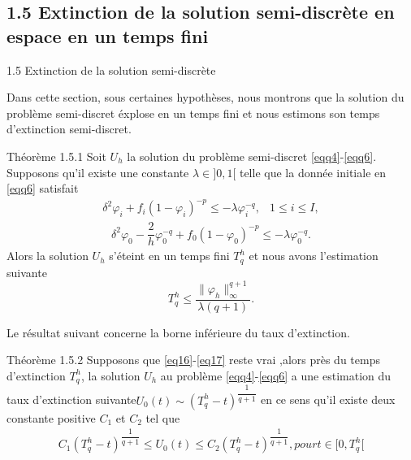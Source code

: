 \documentclass[10pt]{beamer}
\begin{document}
  \begin{frame}
  \subsection{1.5 Extinction de la solution semi-discrète en espace en un temps fini}
\begin{block}{1.5 Extinction de la solution semi-discrète}\end{block}
 Dans cette section, sous certaines hypothèses, nous montrons que la solution du problème semi-discret éxplose en un temps fini et nous estimons son temps d'extinction semi-discret.\\ 
  \begin{block}{Théorème 1.5.1}
  Soit  $ U_{h} $ la solution du problème semi-discret \eqref{eqq4}-\eqref{eqq6}. Supposons qu'il existe une constante  $ \lambda \in ]0,1[$ telle que la donnée initiale en \eqref{eqq6}
satisfait
\begin{eqnarray}
\delta^{2}\varphi_{i}+f_i(1-\varphi_{i})^{-p}\leq -\lambda \varphi_{i}^{-q}  , & 1\leq i \leq I,\label{eq16}
\end{eqnarray}
\begin{eqnarray} 
\delta^{2}\varphi_{0}-\dfrac{2}{h}\varphi_{0}^{-q}+f_0(1-\varphi_{0})^{-p} \leq -\lambda \varphi_{0}^{-q}.\label{eq17}
\end{eqnarray}
Alors la solution $ U_{h} $ s'éteint en un temps fini   $ T_{q}^{h} $ et nous avons l'estimation suivante
$$ T_{q}^{h} \leq \dfrac{ \| \varphi_{h} \|_{\infty}^{q+1}}{\lambda(q+1)}. $$
    \end{block}

\end{frame}
\begin{frame}
Le résultat suivant concerne la borne inférieure du taux d'extinction.
\begin{block}{Théorème 1.5.2}
  Supposons que \eqref{eq16}-\eqref{eq17} reste vrai ,alors près du temps d'extinction $T_{q}^{h}$, la solution $U_h$ au problème \eqref{eqq4}-\eqref{eqq6}  a une estimation du taux d'extinction suivante$ U_{0}(t)\sim \left( T_{q}^{h} - t \right) ^{\dfrac{1}{q+1}}$ en ce sens qu'il existe deux constante positive $C_1$ et $C_2$ tel que 
\begin{eqnarray}
 C_{1}\left( T_{q}^{h}-t\right) ^{\dfrac{1}{q+1}}\leq U_0(t) \leq  C_{2}\left( T_{q}^{h}-t\right) ^{\dfrac{1}{q+1}}, pour t\in [0,T_{q}^{h}[
\end{eqnarray}
    \end{block}
 \end{frame}
 
\end{document}
